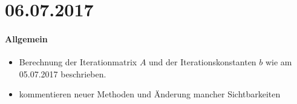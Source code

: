 \section*{06.07.2017}

\paragraph{Allgemein}
\begin{itemize}
	\item Berechnung der Iterationmatrix $A$ und der Iterationskonstanten $b$ wie am 05.07.2017 beschrieben.
	\item kommentieren neuer Methoden und Änderung mancher Sichtbarkeiten
\end{itemize}